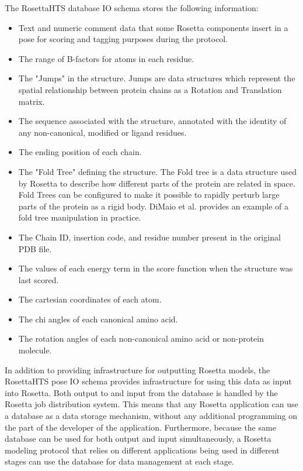 The RosettaHTS database IO schema stores the following information:

\begin{itemize}
	\item Text and numeric comment data that some Rosetta components insert in a pose for scoring and tagging purposes during the protocol.
	\item The range of B-factors for atoms in each residue.
	\item The "Jumps" in the structure.  Jumps are data structures which represent the spatial relationship between protein chains as a Rotation and Translation matrix.
	\item The sequence associated with the structure, annotated with the identity of any non-canonical, modified or ligand residues.
	\item The ending position of each chain.
	\item The "Fold Tree" defining the structure.  The Fold tree is a data structure used by Rosetta to describe how different parts of the protein are related in space.  Fold Trees can be configured to make it possible to rapidly perturb large parts of the protein as a rigid body.  DiMaio et al. \citep{DiMaio:2011cu} provides an example of a fold tree manipulation in practice.
	\item The Chain ID, insertion code, and residue number present in the original PDB file.
	\item The values of each energy term in the score function when the structure was last scored.
	\item The cartesian coordinates of each atom.
	\item The chi angles of each canonical amino acid.
	\item The rotation angles of each non-canonical amino acid or non-protein molecule.
\end{itemize}

In addition to providing infrastructure for outputting Rosetta models, the RosettaHTS pose IO schema provides infrastructure for using this data as input into Rosetta.
Both output to and input from the database is handled by the Rosetta job distribution system.
This means that any Rosetta application can use a database as a data storage mechanism, without any additional programming on the part of the developer of the application.
Furthermore, because the same database can be used for both output and input simultaneously, a Rosetta modeling protocol that relies on different applications being used in different stages can use the database for data management at each stage.

